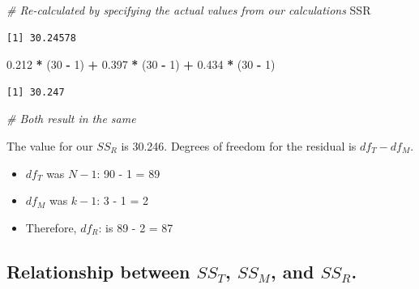 \documentclass[
  11pt,
]{book}
\newenvironment{Shaded}{\begin{snugshade}}{\end{snugshade}}
\newcommand{\CommentTok}[1]{\textcolor[rgb]{0.37,0.37,0.37}{\textit{#1}}}
\newcommand{\DecValTok}[1]{\textcolor[rgb]{0.06,0.06,0.06}{#1}}
\newcommand{\FloatTok}[1]{\textcolor[rgb]{0.06,0.06,0.06}{#1}}
\newcommand{\NormalTok}[1]{#1}
\newcommand{\SpecialCharTok}[1]{\textcolor[rgb]{0.43,0.43,0.43}{\textbf{#1}}}
\providecommand{\tightlist}{%
  \setlength{\itemsep}{0pt}\setlength{\parskip}{0pt}}
\begin{document}
\begin{Shaded}
\begin{Highlighting}[]
\CommentTok{\# Re{-}calculated by specifying the actual values from our calculations}
\NormalTok{SSR}
\end{Highlighting}
\end{Shaded}

\begin{verbatim}
[1] 30.24578
\end{verbatim}

\begin{Shaded}
\begin{Highlighting}[]
\FloatTok{0.212} \SpecialCharTok{*}\NormalTok{ (}\DecValTok{30} \SpecialCharTok{{-}} \DecValTok{1}\NormalTok{) }\SpecialCharTok{+} \FloatTok{0.397} \SpecialCharTok{*}\NormalTok{ (}\DecValTok{30} \SpecialCharTok{{-}} \DecValTok{1}\NormalTok{) }\SpecialCharTok{+} \FloatTok{0.434} \SpecialCharTok{*}\NormalTok{ (}\DecValTok{30} \SpecialCharTok{{-}} \DecValTok{1}\NormalTok{)}
\end{Highlighting}
\end{Shaded}

\begin{verbatim}
[1] 30.247
\end{verbatim}

\begin{Shaded}
\begin{Highlighting}[]
\CommentTok{\# Both result in the same}
\end{Highlighting}
\end{Shaded}

The value for our \(SS_R\) is 30.246. Degrees of freedom for the residual is \(df_T - df_M\).

\begin{itemize}
\tightlist
\item
  \(df_T\) was \(N-1\): 90 - 1 = 89
\item
  \(df_M\) was \(k - 1\): 3 - 1 = 2
\item
  Therefore, \(df_R\): is 89 - 2 = 87
\end{itemize}

\hypertarget{relationship-between-ss_t-ss_m-and-ss_r.}{%
\subsection{\texorpdfstring{Relationship between \(SS_T\), \(SS_M\), and \(SS_R\).}{Relationship between SS\_T, SS\_M, and SS\_R.}}\label{relationship-between-ss_t-ss_m-and-ss_r.}}
\end{document}

